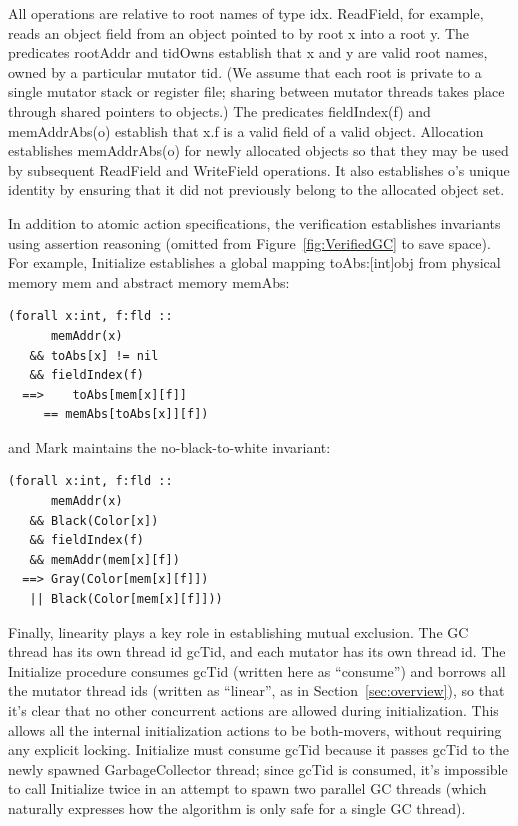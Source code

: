 All operations are relative to root names of type idx.
ReadField, for example, reads an object field from an object pointed to by root x into a root y.
The predicates rootAddr and tidOwns establish that x and y are valid root names, owned by a particular mutator tid.
(We assume that each root is private to a single mutator stack or register file;
sharing between mutator threads takes place through shared pointers to objects.)
The predicates fieldIndex(f) and memAddrAbs(o) establish that x.f is a valid field of a valid object.
Allocation establishes memAddrAbs(o) for newly allocated objects so that they may be used by subsequent ReadField and WriteField operations.
It also establishes o's unique identity by ensuring that it did not previously belong to the allocated object set.

In addition to atomic action specifications, the verification establishes invariants using assertion reasoning
(omitted from Figure~\ref{fig:VerifiedGC} to save space).
For example, Initialize establishes a global mapping toAbs:[int]obj from physical memory mem and abstract memory memAbs:

\begin{verbatim}
(forall x:int, f:fld ::
      memAddr(x)
   && toAbs[x] != nil
   && fieldIndex(f)
  ==>    toAbs[mem[x][f]]
     == memAbs[toAbs[x]][f])
\end{verbatim}

and Mark maintains the no-black-to-white invariant:

\begin{verbatim}
(forall x:int, f:fld ::
      memAddr(x)
   && Black(Color[x])
   && fieldIndex(f)
   && memAddr(mem[x][f])
  ==> Gray(Color[mem[x][f]])
   || Black(Color[mem[x][f]]))
\end{verbatim}

Finally, linearity plays a key role in establishing mutual exclusion.
The GC thread has its own thread id gcTid, and each mutator has its own thread id.
The Initialize procedure consumes gcTid (written here as ``consume'')
and borrows all the mutator thread ids (written as ``linear'', as in Section~\ref{sec:overview}),
so that it's clear that no other concurrent actions are allowed during initialization.
This allows all the internal initialization actions to be both-movers, without requiring any explicit locking.
Initialize must consume gcTid because it passes gcTid to the newly spawned GarbageCollector thread;
since gcTid is consumed, it's impossible to call Initialize twice in an attempt to spawn two parallel GC threads
(which naturally expresses how the algorithm is only safe for a single GC thread).

